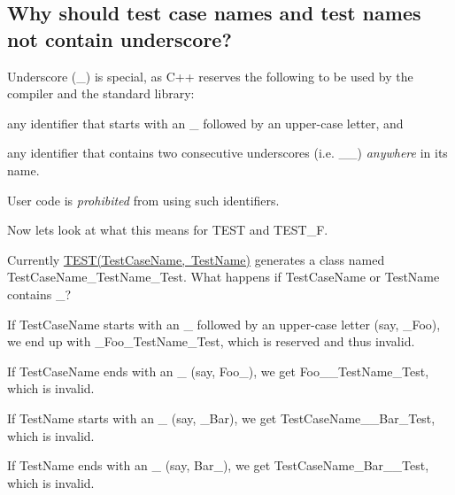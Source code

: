 \subsection*{Why should test case names and test names not contain underscore?}

Underscore ({\ttfamily \+\_\+}) is special, as C++ reserves the following to be used by the compiler and the standard library\+:


\begin{DoxyEnumerate}
\item any identifier that starts with an {\ttfamily \+\_\+} followed by an upper-\/case letter, and
\end{DoxyEnumerate}
\begin{DoxyEnumerate}
\item any identifier that contains two consecutive underscores (i.\+e. {\ttfamily \+\_\+\+\_\+}) {\itshape anywhere} in its name.
\end{DoxyEnumerate}

User code is {\itshape prohibited} from using such identifiers.

Now let\textquotesingle{}s look at what this means for {\ttfamily T\+E\+ST} and {\ttfamily T\+E\+S\+T\+\_\+F}.

Currently {\ttfamily \mbox{\hyperlink{_obj__test_2lib_2googletest-release-1_88_81_2googletest_2include_2gtest_2gtest_8h_ad8b332753515c0ab8baada563c2547eb}{T\+E\+S\+T(\+Test\+Case\+Name, Test\+Name)}}} generates a class named {\ttfamily Test\+Case\+Name\+\_\+\+Test\+Name\+\_\+\+Test}. What happens if {\ttfamily Test\+Case\+Name} or {\ttfamily Test\+Name} contains {\ttfamily \+\_\+}?


\begin{DoxyEnumerate}
\item If {\ttfamily Test\+Case\+Name} starts with an {\ttfamily \+\_\+} followed by an upper-\/case letter (say, {\ttfamily \+\_\+\+Foo}), we end up with {\ttfamily \+\_\+\+Foo\+\_\+\+Test\+Name\+\_\+\+Test}, which is reserved and thus invalid.
\end{DoxyEnumerate}
\begin{DoxyEnumerate}
\item If {\ttfamily Test\+Case\+Name} ends with an {\ttfamily \+\_\+} (say, {\ttfamily Foo\+\_\+}), we get {\ttfamily Foo\+\_\+\+\_\+\+Test\+Name\+\_\+\+Test}, which is invalid.
\end{DoxyEnumerate}
\begin{DoxyEnumerate}
\item If {\ttfamily Test\+Name} starts with an {\ttfamily \+\_\+} (say, {\ttfamily \+\_\+\+Bar}), we get {\ttfamily Test\+Case\+Name\+\_\+\+\_\+\+Bar\+\_\+\+Test}, which is invalid.
\end{DoxyEnumerate}
\begin{DoxyEnumerate}
\item If {\ttfamily Test\+Name} ends with an {\ttfamily \+\_\+} (say, {\ttfamily Bar\+\_\+}), we get {\ttfamily Test\+Case\+Name\+\_\+\+Bar\+\_\+\+\_\+\+Test}, which is invalid.
\end{DoxyEnumerate}

